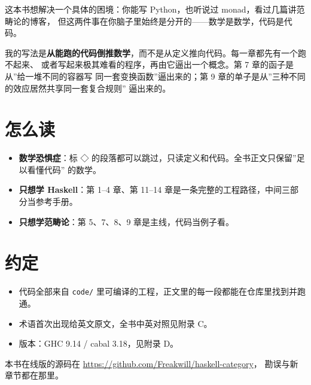 这本书想解决一个具体的困境：你能写 Python，也听说过 monad，看过几篇讲范畴论的博客，
但这两件事在你脑子里始终是分开的------数学是数学，代码是代码。

我的写法是\textbf{从能跑的代码倒推数学}，而不是从定义推向代码。每一章都先有一个跑不起来、
或者写起来极其难看的程序，再由它逼出一个概念。第 7 章的函子是从''给一堆不同的容器写
同一套变换函数''逼出来的；第 9 章的单子是从''三种不同的效应居然共享同一套复合规则''
逼出来的。

\section{怎么读}\label{ux600eux4e48ux8bfb}

\begin{itemize}
\tightlist
\item
  \textbf{数学恐惧症}：标 ◇ 的段落都可以跳过，只读定义和代码。全书正文只保留''足以看懂代码''
  的数学。
\item
  \textbf{只想学 Haskell}：第 1--4 章、第 11--14 章是一条完整的工程路径，中间三部分当参考手册。
\item
  \textbf{只想学范畴论}：第 5、7、8、9 章是主线，代码当例子看。
\end{itemize}

\section{约定}\label{ux7ea6ux5b9a}

\begin{itemize}
\tightlist
\item
  代码全部来自 \passthrough{\lstinline!code/!} 里可编译的工程，正文里的每一段都能在仓库里找到并跑通。
\item
  术语首次出现给英文原文，全书中英对照见附录 C。
\item
  版本：GHC 9.14 / cabal 3.18，见附录 D。
\end{itemize}

本书在线版的源码在 \url{https://github.com/Freakwill/haskell-category}，
勘误与新章节都在那里。
